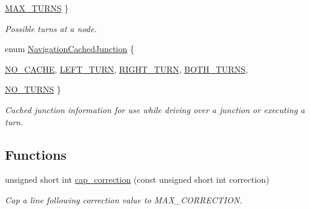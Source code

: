 \begin{DoxyCompactItemize}
\par
\hyperlink{namespaceIDP_ab8b8e9ff9f7de27da30c1fffaeef4b72a46fc0b6ab4752131480e4a05b09e1280}{MAX\_\-TURNS}
 \}
\begin{DoxyCompactList}\small\item\em Possible turns at a node. \item\end{DoxyCompactList}\item 
enum \hyperlink{namespaceIDP_a628dde0214c4c861deda405e77ad75a2}{NavigationCachedJunction} \{ \par
\hyperlink{namespaceIDP_a628dde0214c4c861deda405e77ad75a2a35431162cfca423a194c5680b2f56b4e}{NO\_\-CACHE}, 
\hyperlink{namespaceIDP_a628dde0214c4c861deda405e77ad75a2a145fe4dd7949a83a0dec44b73c2ec852}{LEFT\_\-TURN}, 
\hyperlink{namespaceIDP_a628dde0214c4c861deda405e77ad75a2a93bc5c5f7716052e0a1ae894ce62c0ea}{RIGHT\_\-TURN}, 
\hyperlink{namespaceIDP_a628dde0214c4c861deda405e77ad75a2a261d3686e8d0ca300956b91c987889db}{BOTH\_\-TURNS}, 
\par
\hyperlink{namespaceIDP_a628dde0214c4c861deda405e77ad75a2a0a75c4d06bf2d5a2b4d1c37cede78ddd}{NO\_\-TURNS}
 \}
\begin{DoxyCompactList}\small\item\em Cached junction information for use while driving over a junction or executing a turn. \item\end{DoxyCompactList}\end{DoxyCompactItemize}
\subsection*{Functions}
\begin{DoxyCompactItemize}
\item 
unsigned short int \hyperlink{namespaceIDP_ae66b1b69bcde3ba7995f2fd46c6f21f5}{cap\_\-correction} (const unsigned short int correction)
\begin{DoxyCompactList}\small\item\em Cap a line following correction value to MAX\_\-CORRECTION. \item\end{DoxyCompactList}\end{DoxyCompactItemize}
